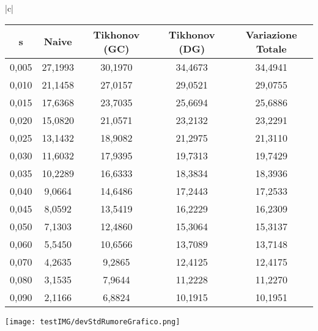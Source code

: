 \documentclass{article}
\begin{document}
\begin{tabular}{ |c|}
\hline
{} \\
\hline
\begin{tabular}{c|c|c|c|c}
s  & Naive & Tikhonov (GC) & Tikhonov (DG) & Variazione Totale\\
\hline
0,005 & 27,1993 & 30,1970 & 34,4673 & 34,4941 \\
0,010 & 21,1458 & 27,0157 & 29,0521 & 29,0755 \\
0,015 & 17,6368 & 23,7035 & 25,6694 & 25,6886 \\
0,020 & 15,0820 & 21,0571 & 23,2132 & 23,2291 \\
0,025 & 13,1432 & 18,9082 & 21,2975 & 21,3110 \\
0,030 & 11,6032 & 17,9395 & 19,7313 & 19,7429 \\
0,035 & 10,2289 & 16,6333 & 18,3834 & 18,3936 \\
0,040 & 9,0664 & 14,6486 & 17,2443 & 17,2533 \\
0,045 & 8,0592 & 13,5419 & 16,2229 & 16,2309 \\
0,050 & 7,1303 & 12,4860 & 15,3064 & 15,3137 \\
0,060 & 5,5450 & 10,6566 & 13,7089 & 13,7148 \\
0,070 & 4,2635 & 9,2865 & 12,4125 & 12,4175 \\
0,080 & 3,1535 & 7,9644 & 11,2228 & 11,2270 \\
0,090 & 2,1166 & 6,8824 & 10,1915 & 10,1951 \\
\hline
\end{tabular}
\end{tabular}

\hskip-2.5cm\texttt{[image: testIMG/devStdRumoreGrafico.png]}

\vspace*{20px}
\end{document}
